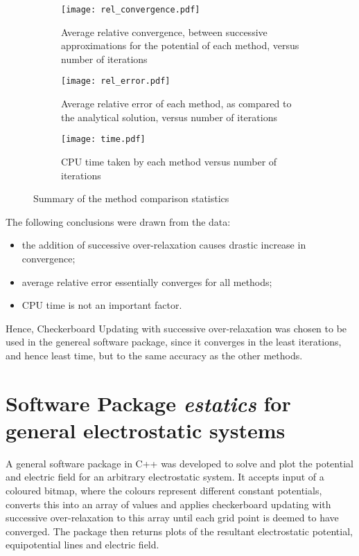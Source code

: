 \documentclass[12pt, a4paper]{article}
\begin{document}
\begin{figure}
\centering
\begin{subfigure}{0.8\textwidth}
	\texttt{[image: rel\_convergence.pdf]}
	\caption{Average relative convergence, between successive approximations for the potential of each method, versus number of iterations}
	\label{fig:conv}
\end{subfigure}

\begin{subfigure}{0.8\textwidth}
	\texttt{[image: rel\_error.pdf]}
	\caption{Average relative error of each method, as compared to the analytical solution, versus number of iterations}
	\label{fig:err}
\end{subfigure}

\begin{subfigure}{0.8\textwidth}
	\texttt{[image: time.pdf]}
	\caption{CPU time taken by each method versus number of iterations}
	\label{fig:time}
\end{subfigure}
\caption{Summary of the method comparison statistics}
\label{fig:stats}
\end{figure}

The following conclusions were drawn from the data:
%
\begin{itemize}
\item the addition of successive over-relaxation causes drastic increase in convergence;
\item average relative error essentially converges for all methods;
\item CPU time is not an important factor.
\end{itemize}


Hence, Checkerboard Updating with successive over-relaxation was chosen to be used
in the genereal software package, since it converges in the least iterations,
and hence least time, but to the same accuracy as the other methods.

\section{Software Package \emph{estatics} for general electrostatic systems}

A general software package in C++ was developed to solve and plot the potential and
electric field for an arbitrary electrostatic system. It accepts input of a coloured
bitmap, where the colours represent different constant potentials, converts this into
an array of values and applies checkerboard updating with successive over-relaxation
to this array until each grid point is deemed to have converged. The package then
returns plots of the resultant electrostatic potential, equipotential lines and electric
field.
\end{document}
